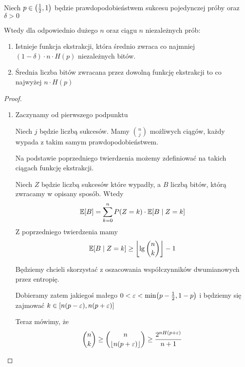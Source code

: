 \begin{theorem}[Twierdzenie 10.5 P\&C]
	Niech \( p \in \left(\frac{1}{2}, 1\right) \) będzie prawdopodobieństwem sukcesu pojedynczej próby oraz \( \delta > 0 \)

	Wtedy dla odpowiednio dużego \( n \) oraz ciągu \( n \) niezależnych prób:
	\begin{enumerate}
		\item Istnieje funkcja ekstrakcji, która średnio zwraca co najmniej \((1 - \delta) \cdot n \cdot H(p) \) niezależnych bitów.
		\item Średnia liczba bitów zwracana przez dowolną funkcję ekstrakcji to co najwyżej \( n \cdot H(p) \)
	\end{enumerate}
\end{theorem}
\begin{proof} \( \)
	\begin{enumerate}
		\item Zaczynamy od pierwszego podpunktu

		      Niech \( j \) będzie liczbą sukcesów. Mamy \( \binom{n}{j} \) możliwych ciągów, każdy wypada z takim samym prawdopodobieństwem.

		      Na podstawie poprzedniego twierdzenia możemy zdefiniować na takich ciągach funkcję ekstrakcji.

		      Niech \( Z \) będzie liczbą sukcesów które wypadły, a \( B \) liczbą bitów, którą zwracamy w opisany sposób. Wtedy
		      \[
			      \expected{B} = \sum_{k=0}^n P(Z = k) \cdot \expected{B \mid Z = k}
		      \]
		      Z poprzedniego twierdzenia mamy
		      \[
			      \expected{B \mid Z = k} \geq \floor{\lg \binom{n}{k}} - 1
		      \]

		      Będziemy chcieli skorzystać z oszacowania współczynników dwumianowych przez entropię.

		      Dobieramy zatem jakiegoś małego \( 0 < \varepsilon < \min\pars{p-\frac{1}{2}, 1-p} \)
		      i będziemy się zajmować \( k \in \left[n(p-\varepsilon), n(p+\varepsilon)\right] \)

		      Teraz mówimy, że
		      \[
			      \binom{n}{k} \geq \binom{n}{\left\lfloor n(p+\varepsilon)\right\rfloor} \geq \frac{2^{nH(p + \varepsilon)}}{n+1}
		      \]


\end{enumerate}
\end{proof}
